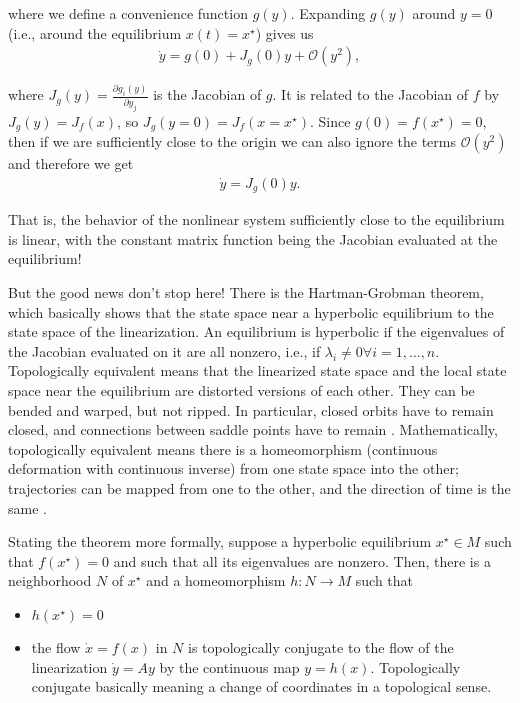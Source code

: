 where we define a convenience function $g(y)$. Expanding $g(y)$ around $y=0$ (i.e., around the equilibrium $x(t) = x^\star$) gives us 
%
\begin{align}
    \dot{y} = g(0) + J_g(0) y + \mathcal{O}(y^2),
\end{align}

where $J_g(y) = \frac{\partial g_i(y)}{\partial y_j}$ is the Jacobian of $g$. It is related to the Jacobian of $f$ by $J_g(y) = J_f(x)$, so $J_g(y=0) = J_f(x=x^\star)$. Since $g(0) = f(x^\star) = 0$, then if we are sufficiently close to the origin we can also ignore the terms $\mathcal{O}(y^2)$ and therefore we get 
%
\begin{align}
    \dot{y} = J_g(0) y.
\end{align}

That is, the behavior of the nonlinear system sufficiently close to the equilibrium is linear, with the constant matrix function being the Jacobian evaluated at the equilibrium! 

But the good news don't stop here! There is the Hartman-Grobman theorem, which basically shows that the state space near a hyperbolic equilibrium to the state space of the linearization. An equilibrium is hyperbolic if the eigenvalues of the Jacobian evaluated on it are all nonzero, i.e., if $\lambda_i \neq 0 \forall i=1,\ldots,n$. Topologically equivalent means that the linearized state space and the local state space near the equilibrium are distorted versions of each other. They can be bended and warped, but not ripped. In particular, closed orbits have to remain closed, and connections between saddle points have to remain \cite{strogatz2002nonlinear}. Mathematically, topologically equivalent means there is a homeomorphism (continuous deformation with continuous inverse) from one state space into the other; trajectories can be mapped from one to the other, and the direction of time is the same \cite{strogatz2002nonlinear}. 

Stating the theorem more formally, suppose a hyperbolic equilibrium $x^\star \in M$ such that $f(x^\star) = 0$ and such that all its eigenvalues are nonzero. Then, there is a neighborhood $N$ of $x^\star$ and a homeomorphism $h: N\to M$ such that \cite{argyrisbook}
\begin{itemize}
    \item $h(x^\star) = 0$
    \item the flow $\dot{x} = f(x)$ in $N$ is topologically conjugate to the flow of the linearization $\dot{y} = A y$ by the continuous map $y = h(x)$. Topologically conjugate basically meaning a change of coordinates in a topological sense.
\end{itemize}

